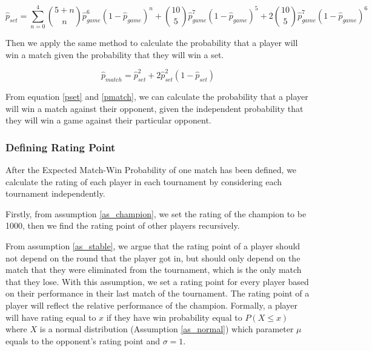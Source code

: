 \begin{equation}
    \hat{p}_{set} = \sum_{n=0}^{4} \binom{5+n}{n} \hat{p}_{game}^6 (1-\hat{p}_{game})^n + \binom{10}{5} \hat{p}_{game}^7 (1-\hat{p}_{game})^5 + 2 \binom{10}{5} \hat{p}_{game}^7 (1-\hat{p}_{game})^6
    \label{pset}
\end{equation}

Then we apply the same method to calculate the probability that a player will win a match given the probability that they will win a set. %

\begin{equation}
    \hat{p}_{match} = \hat{p}_{set}^2 + 2\hat{p}_{set}^2(1-\hat{p}_{set})
    \label{pmatch}
\end{equation}

From equation \ref{pset} and \ref{pmatch}, we can calculate the probability that a player will win a match against their opponent, given the independent probability that they will win a game against their particular opponent. %

\subsubsection{Defining Rating Point}
\label{ratingdefinition}

After the Expected Match-Win Probability of one match has been defined, we calculate the rating of each player in each tournament by considering each tournament independently. %

Firstly, from assumption \ref{as_champion}, we set the rating of the champion to be 1000, then we find the rating point of other players recursively. %

From assumption \ref{as_stable}, we argue that the rating point of a player should not depend on the round that the player got in, but should only depend on the match that they were eliminated from the tournament, which is the only match that they lose. With this assumption, we set a rating point for every player based on their performance in their last match of the tournament. The rating point of a player will reflect the relative performance of the champion. Formally, a player will have rating equal to $x$ if they have win probability equal to $P(X \leq x)$ where $X$ is a normal distribution (Assumption \ref{as_normal}) which parameter $\mu$ equals to the opponent's rating point and $\sigma = 1$. %

